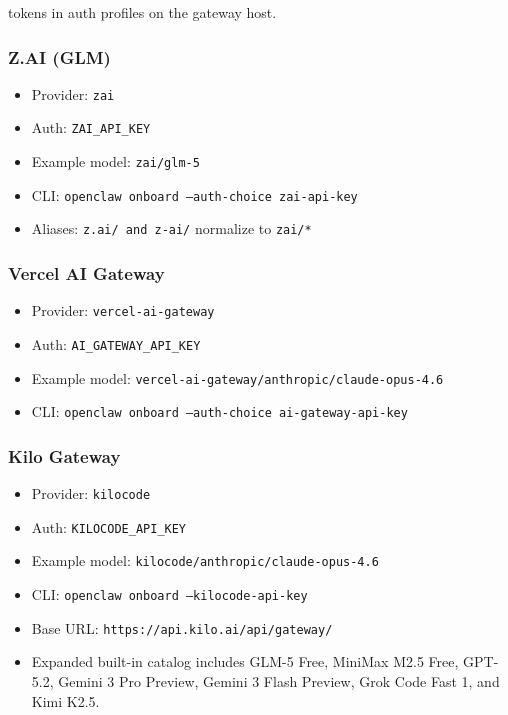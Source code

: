 tokens in auth profiles on the gateway host.

\subsubsection{Z.AI (GLM)}


\begin{itemize}
  \item Provider: \texttt{zai}
  \item Auth: \texttt{ZAI\_API\_KEY}
  \item Example model: \texttt{zai/glm-5}
  \item CLI: \texttt{openclaw onboard --auth-choice zai-api-key}
  \item Aliases: \texttt{z.ai/\textit{} and \texttt{z-ai/}} normalize to \texttt{zai/*}
\end{itemize}


\subsubsection{Vercel AI Gateway}


\begin{itemize}
  \item Provider: \texttt{vercel-ai-gateway}
  \item Auth: \texttt{AI\_GATEWAY\_API\_KEY}
  \item Example model: \texttt{vercel-ai-gateway/anthropic/claude-opus-4.6}
  \item CLI: \texttt{openclaw onboard --auth-choice ai-gateway-api-key}
\end{itemize}


\subsubsection{Kilo Gateway}


\begin{itemize}
  \item Provider: \texttt{kilocode}
  \item Auth: \texttt{KILOCODE\_API\_KEY}
  \item Example model: \texttt{kilocode/anthropic/claude-opus-4.6}
  \item CLI: \texttt{openclaw onboard --kilocode-api-key }
  \item Base URL: \texttt{https://api.kilo.ai/api/gateway/}
  \item Expanded built-in catalog includes GLM-5 Free, MiniMax M2.5 Free, GPT-5.2, Gemini 3 Pro Preview, Gemini 3 Flash Preview, Grok Code Fast 1, and Kimi K2.5.
\end{itemize}


